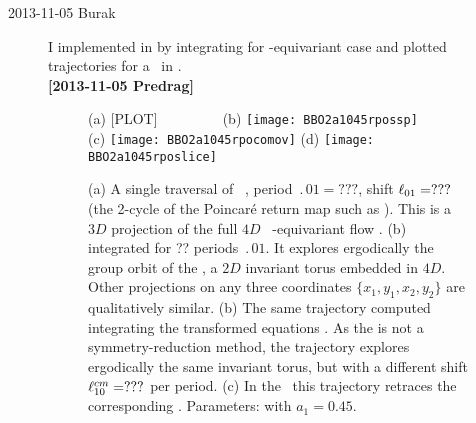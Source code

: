 \begin{description}
\item[2013-11-05 Burak] I implemented in {\mconn}  by integrating 
for -equivariant case and plotted trajectories for a \rpo\ in .
\\
{\bf [2013-11-05 Predrag]} 

\begin{figure}%
\centering
 (a) [PLOT] $~~~~~~~~~~~~~~~~~~$
 (b) \texttt{[image: BBO2a1045rpossp]}
 \\
 (c) \texttt{[image: BBO2a1045rpocomov]}
 (d) \texttt{[image: BBO2a1045rposlice]}
\caption{
(a) A single traversal of \rpo\ , period $\period{01}=???$,
shift $\ell_{01}=???$ (the 2-cycle of the Poincar\'e return map
such as ). This is a $3D$ projection of the
full $4D$ \statesp\ -equivariant {\twomode} flow
.
(b) \Rpo\  integrated for  ?? periods $\period{01}$. It
explores ergodically the group orbit of the \rpo, a $2D$ invariant
torus embedded in $4D$. Other projections on any three coordinates
$\{x_1,y_1,x_2,y_2\}$ are qualitatively similar.
(b) The same trajectory computed integrating the {\comovframe}
transformed equations . As the {\mconn} is not a
symmetry-reduction method, the trajectory explores ergodically the
same invariant torus, but with a different shift $\ell_{10}^{cm}=???$
per period.
(c)  In the \slice\ this trajectory retraces the corresponding \po.
Parameters:  with $a_1 = 0.45$.
}
\label{fig:BBO2RpoSspComovSlice}
\end{figure}



\end{description}
